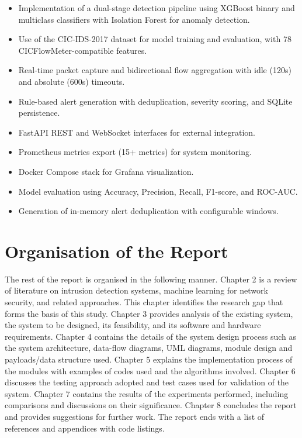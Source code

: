 \documentclass[12pt,a4paper]{report}
\begin{document}
\begin{itemize}
    \item Implementation of a dual-stage detection pipeline using XGBoost binary and multiclass classifiers with Isolation Forest for anomaly detection.

    \item Use of the CIC-IDS-2017 dataset for model training and evaluation, with 78 CICFlowMeter-compatible features.

    \item Real-time packet capture and bidirectional flow aggregation with idle (120s) and absolute (600s) timeouts.

    \item Rule-based alert generation with deduplication, severity scoring, and SQLite persistence.

    \item FastAPI REST and WebSocket interfaces for external integration.

    \item Prometheus metrics export (15+ metrics) for system monitoring.

    \item Docker Compose stack for Grafana visualization.

    \item Model evaluation using Accuracy, Precision, Recall, F1-score, and ROC-AUC.

    \item Generation of in-memory alert deduplication with configurable windows.
\end{itemize}

\section{Organisation of the Report}

The rest of the report is organised in the following manner. Chapter 2 is a review of literature on intrusion detection systems, machine learning for network security, and related approaches. This chapter identifies the research gap that forms the basis of this study. Chapter 3 provides analysis of the existing system, the system to be designed, its feasibility, and its software and hardware requirements. Chapter 4 contains the details of the system design process such as the system architecture, data-flow diagrams, UML diagrams, module design and payloads/data structure used. Chapter 5 explains the implementation process of the modules with examples of codes used and the algorithms involved. Chapter 6 discusses the testing approach adopted and test cases used for validation of the system. Chapter 7 contains the results of the experiments performed, including comparisons and discussions on their significance. Chapter 8 concludes the report and provides suggestions for further work. The report ends with a list of references and appendices with code listings.
\end{document}
